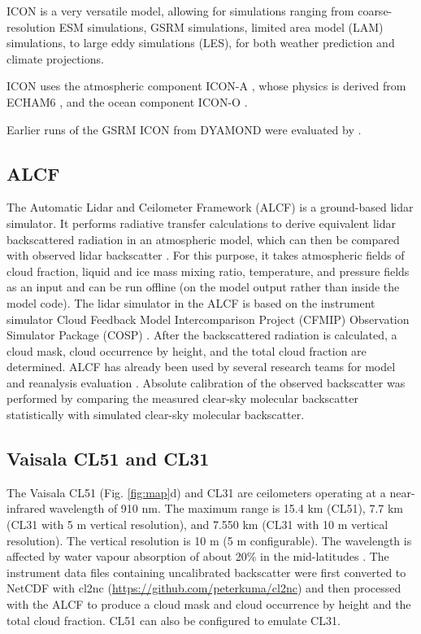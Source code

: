 \documentclass[12pt,a4paper]{article}
\begin{document}
ICON is a very versatile model, allowing for simulations ranging from
coarse-resolution ESM simulations, GSRM simulations, limited area model (LAM)
simulations, to large eddy simulations (LES), for both weather prediction and
climate projections.

ICON uses the atmospheric component ICON-A \citep{giorgetta2018}, whose physics
is derived from ECHAM6 \citep{stevens2013}, and the ocean component ICON-O
\citep{korn2022}.

Earlier runs of the GSRM ICON from DYAMOND were evaluated by
\cite{mauritsen2022}.

\subsection{ALCF}

The Automatic Lidar and Ceilometer Framework (ALCF) is a ground-based lidar
simulator. It performs radiative transfer calculations to derive equivalent
lidar backscattered radiation in an atmospheric model, which can then be
compared with observed lidar backscatter \citep{kuma2021}. For this purpose, it
takes atmospheric fields of cloud fraction, liquid and ice mass mixing ratio,
temperature, and pressure fields as an input and can be run offline (on the
model output rather than inside the model code). The lidar simulator in the
ALCF is based on the instrument simulator Cloud Feedback Model Intercomparison
Project (CFMIP) Observation Simulator Package (COSP) \citep{bodas-salcedo2011}.
After the backscattered radiation is calculated, a cloud mask, cloud occurrence
by height, and the total cloud fraction are determined. ALCF has already been
used by several research teams for model and reanalysis evaluation
\citep{kuma2020,kremser2021,guyot2022,pei2023,whitehead2023,mcdonald2024}.
Absolute calibration of the observed backscatter was performed by comparing the
measured clear-sky molecular backscatter statistically with simulated clear-sky
molecular backscatter.

\subsection{Vaisala CL51 and CL31}
\label{sec:cl51}

The Vaisala CL51 (Fig. \ref{fig:map}d) and CL31 are ceilometers operating at a
near-infrared wavelength of 910 nm. The maximum range is 15.4 km (CL51), 7.7 km
(CL31 with 5 m vertical resolution), and 7.550 km (CL31 with 10 m vertical
resolution).  The vertical resolution is 10 m (5 m configurable). The
wavelength is affected by water vapour absorption of about 20\% in the
mid-latitudes \citep{wiegner2015,wiegner2019}.  The instrument data files
containing uncalibrated backscatter were first converted to NetCDF with cl2nc
(\url{https://github.com/peterkuma/cl2nc}) and then processed with the ALCF to
produce a cloud mask and cloud occurrence by height and the total cloud
fraction. CL51 can also be configured to emulate CL31.
\end{document}
